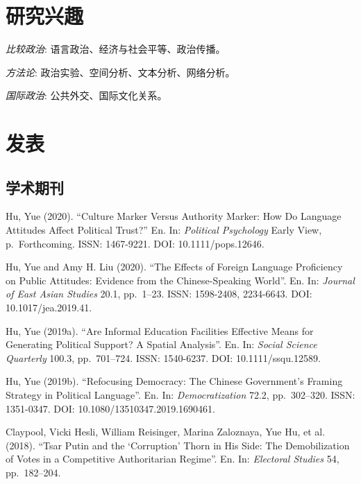 \documentclass[10.5pt,]{article}
\providecommand{\tightlist}{%
	\setlength{\itemsep}{0pt}\setlength{\parskip}{0pt}}
\renewenvironment{itemize}{
	\begin{list}{}{
			\setlength{\leftmargin}{1.5em}
		}
	}{
	\end{list}
}
\begin{document}
\hypertarget{ux7814ux7a76ux5174ux8da3}{%
\section{研究兴趣}\label{ux7814ux7a76ux5174ux8da3}}

\begin{itemize}
\tightlist
\item
  \emph{比较政治}: 语言政治、经济与社会平等、政治传播。
\item
  \emph{方法论}: 政治实验、空间分析、文本分析、网络分析。
\item
  \emph{国际政治}: 公共外交、国际文化关系。
\end{itemize}

\hypertarget{ux53d1ux8868}{%
\section{发表}\label{ux53d1ux8868}}

\hypertarget{ux5b66ux672fux671fux520a}{%
\subsection{学术期刊}\label{ux5b66ux672fux671fux520a}}

Hu, Yue (2020). ``Culture Marker Versus Authority Marker: How Do
Language Attitudes Affect Political Trust?'' En. In:
\emph{Political Psychology} Early View, p.~Forthcoming. ISSN: 1467-9221.
DOI: 10.1111/pops.12646.

Hu, Yue and Amy H. Liu (2020). ``The Effects of Foreign Language
Proficiency on Public Attitudes: Evidence from the Chinese-Speaking
World''. En. In: \emph{Journal of East Asian Studies} 20.1, pp.~1--23.
ISSN: 1598-2408, 2234-6643. DOI: 10.1017/jea.2019.41.

Hu, Yue (2019a). ``Are Informal Education Facilities Effective Means for
Generating Political Support? A Spatial Analysis''. En. In:
\emph{Social Science Quarterly} 100.3, pp.~701--724. ISSN: 1540-6237.
DOI: 10.1111/ssqu.12589.

Hu, Yue (2019b). ``Refocusing Democracy: The Chinese Government's
Framing Strategy in Political Language''. En. In: \emph{Democratization}
72.2, pp.~302--320. ISSN: 1351-0347. DOI: 10.1080/13510347.2019.1690461.

Claypool, Vicki Hesli, William Reisinger, Marina Zaloznaya, Yue Hu, et
al. (2018). ``Tsar Putin and the `Corruption' Thorn in His Side: The
Demobilization of Votes in a Competitive Authoritarian Regime''. En. In:
\emph{Electoral Studies} 54, pp.~182--204.
\end{document}
